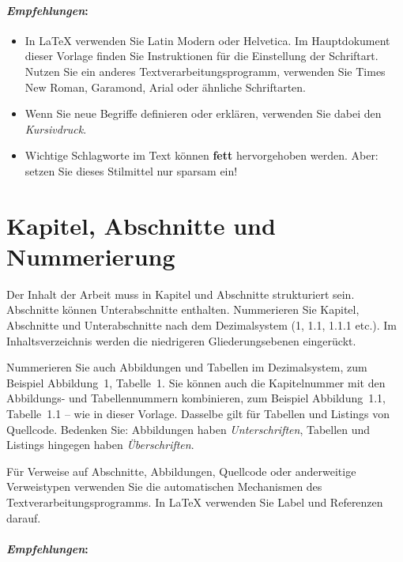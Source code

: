 \paragraph{\textit{Empfehlungen}:}

\begin{itemize}
    \item In \LaTeX{} verwenden Sie Latin Modern oder Helvetica. Im Hauptdokument dieser Vorlage finden Sie Instruktionen für die Einstellung der Schriftart. Nutzen Sie ein anderes Textverarbeitungsprogramm, verwenden Sie Times New Roman, Garamond, Arial oder ähnliche Schriftarten.
    \item Wenn Sie neue Begriffe definieren oder erklären, verwenden Sie dabei den \textit{Kursivdruck}.
    \item Wichtige Schlagworte im Text können \textbf{fett} hervorgehoben werden. Aber: setzen Sie dieses Stilmittel nur sparsam ein!
\end{itemize}




\section{Kapitel, Abschnitte und Nummerierung}

Der Inhalt der Arbeit muss in Kapitel und Abschnitte strukturiert sein. Abschnitte können Unterabschnitte enthalten. Nummerieren Sie Kapitel, Abschnitte und Unterabschnitte nach dem Dezimalsystem (1, 1.1, 1.1.1 etc.). Im Inhaltsverzeichnis werden die niedrigeren Gliederungsebenen eingerückt.

Nummerieren Sie auch Abbildungen und Tabellen im Dezimalsystem, zum Beispiel Abbildung~1, Tabelle~1. Sie können auch die Kapitelnummer mit den Abbildungs- und Tabellennummern kombinieren, zum Beispiel Abbildung~1.1, Tabelle~1.1 -- wie in dieser Vorlage. Dasselbe gilt für Tabellen und Listings von Quellcode. Bedenken Sie: Abbildungen haben \textit{Unterschriften}, Tabellen und Listings hingegen haben \textit{Überschriften}.

Für Verweise auf Abschnitte, Abbildungen, Quellcode oder anderweitige Verweistypen verwenden Sie die automatischen Mechanismen des Textverarbeitungsprogramms. In \LaTeX{} verwenden Sie Label und Referenzen darauf.

\paragraph{\textit{Empfehlungen}:}

